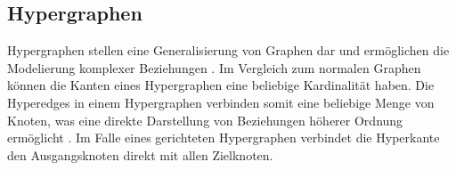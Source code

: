 \subsection{Hypergraphen}
Hypergraphen stellen eine Generalisierung von Graphen dar und ermöglichen die Modelierung komplexer Beziehungen \cite{anglesintro}.
Im Vergleich zum normalen Graphen können die Kanten eines Hypergraphen eine beliebige Kardinalität haben.
Die Hyperedges in einem Hypergraphen verbinden somit eine beliebige Menge von Knoten, was eine direkte Darstellung von Beziehungen höherer Ordnung ermöglicht \cite{iordanov2010hypergraphdb}.
Im Falle eines gerichteten Hypergraphen verbindet die Hyperkante den Ausgangsknoten direkt mit allen Zielknoten.

